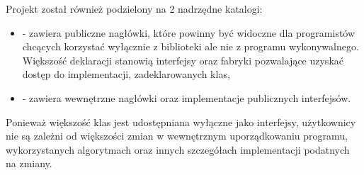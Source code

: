\documentclass[polish]{standalone}
\begin{document}
Projekt został również podzielony na 2 nadrzędne katalogi:
\begin{itemize}
\item {} - zawiera publiczne nagłówki, które powinny być widoczne dla programistów chcących korzystać
wyłącznie z biblioteki ale nie z programu wykonywalnego. Większość deklaracji stanowią interfejsy oraz fabryki
pozwalające uzyskać dostęp do implementacji, zadeklarowanych klas,
\item {} - zawiera wewnętrzne nagłówki oraz implementacje publicznych interfejsów.
\end{itemize}
Ponieważ większość klas jest udostępniana wyłączne jako interfejsy, użytkownicy nie są zależni od większości zmian
w wewnętrznym uporządkowaniu programu, wykorzystanych algorytmach oraz innych szczegółach implementacji podatnych
na zmiany.
\end{document}
